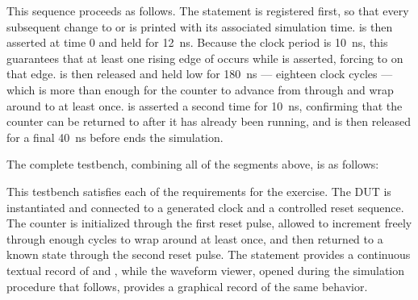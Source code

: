 This sequence proceeds as follows. The  statement is registered first, so that every subsequent change to  or  is printed with its associated simulation time.  is then asserted at time 0 and held for 12~ns. Because the clock period is 10~ns, this guarantees that at least one rising edge of  occurs while  is asserted, forcing  to  on that edge.  is then released and held low for 180~ns --- eighteen clock cycles --- which is more than enough for the counter to advance from  through  and wrap around to  at least once.  is asserted a second time for 10~ns, confirming that the counter can be returned to  after it has already been running, and is then released for a final 40~ns before  ends the simulation.

The complete testbench, combining all of the segments above, is as follows:


This testbench satisfies each of the requirements for the exercise. The DUT is instantiated and connected to a generated clock and a controlled reset sequence. The counter is initialized through the first reset pulse, allowed to increment freely through enough cycles to wrap around at least once, and then returned to a known state through the second reset pulse. The  statement provides a continuous textual record of  and , while the waveform viewer, opened during the simulation procedure that follows, provides a graphical record of the same behavior.


